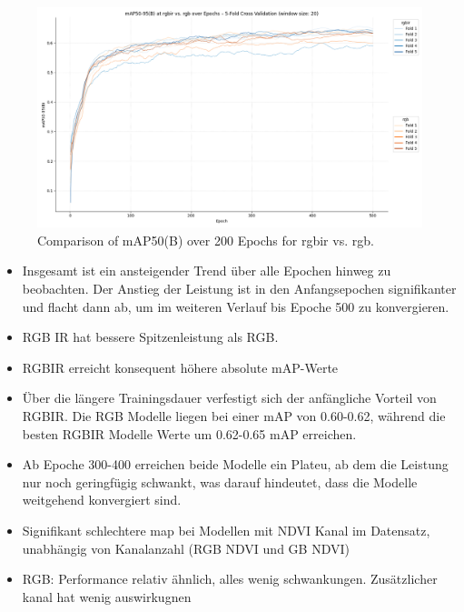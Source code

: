 \begin{figure}[h] 
    \centering %
    \includegraphics[width=1\textwidth]{images/rgbir/mAP@50-95/rgbir_vs_rgb_full.png} %
    \caption{Comparison of mAP50(B) over 200 Epochs for rgbir vs. rgb.} %
    \label{fig:map_rgir_rgb} %
\end{figure}
\begin{itemize}
    \item Insgesamt ist ein ansteigender Trend über alle Epochen hinweg zu beobachten. Der Anstieg der Leistung ist in den Anfangsepochen signifikanter und flacht dann ab, um im weiteren Verlauf bis Epoche 500 zu konvergieren.
    \item RGB IR hat bessere Spitzenleistung als RGB.  
    \item RGBIR erreicht konsequent höhere absolute mAP-Werte 
    \item Über die längere Trainingsdauer verfestigt sich der anfängliche Vorteil von RGBIR. Die RGB Modelle liegen bei einer mAP von 0.60-0.62, während die besten RGBIR Modelle Werte um 0.62-0.65 mAP erreichen.
    \item Ab Epoche 300-400 erreichen beide Modelle ein Plateu, ab dem die Leistung nur noch geringfügig schwankt, was darauf hindeutet, dass die Modelle weitgehend konvergiert sind.
\end{itemize}



\begin{itemize}
    \item Signifikant schlechtere map bei Modellen mit NDVI Kanal im Datensatz, unabhängig von Kanalanzahl (RGB NDVI und GB NDVI)
    \item RGB: Performance relativ ähnlich, alles wenig schwankungen. Zusätzlicher kanal hat wenig auswirkugnen
\end{itemize}

